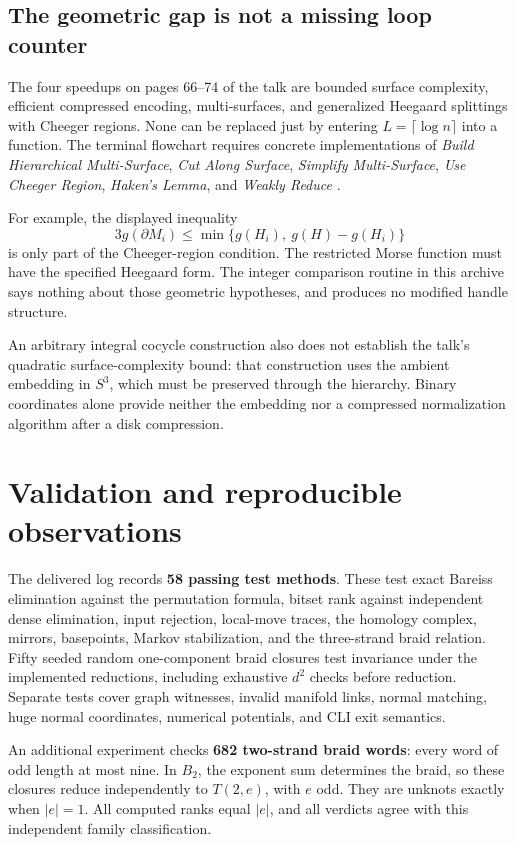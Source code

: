 \documentclass[11pt]{article}
\theoremstyle{definition}
\begin{document}
\subsection{The geometric gap is not a missing loop counter}

The four speedups on pages 66--74 of the talk are bounded surface complexity,
efficient compressed encoding, multi-surfaces, and generalized Heegaard
splittings with Cheeger regions. None can be replaced just by entering
$L=\lceil\log n\rceil$ into a function. The terminal flowchart requires concrete
implementations of \emph{Build Hierarchical Multi-Surface}, \emph{Cut Along
Surface}, \emph{Simplify Multi-Surface}, \emph{Use Cheeger Region},
\emph{Haken's Lemma}, and \emph{Weakly Reduce} \cite[p.~109]{slides}.

For example, the displayed inequality
\[
 3g(\partial M_i)\le
 \min\{g(H_i),\ g(H)-g(H_i)\}
\]
is only part of the Cheeger-region condition. The restricted Morse function
must have the specified Heegaard form. The integer comparison routine in this
archive says nothing about those geometric hypotheses, and produces no
modified handle structure.

An arbitrary integral cocycle construction also does not establish the talk's
quadratic surface-complexity bound: that construction uses the ambient
embedding in $S^3$, which must be preserved through the hierarchy. Binary
coordinates alone provide neither the embedding nor a compressed normalization
algorithm after a disk compression.

\section{Validation and reproducible observations}

The delivered log records \textbf{58 passing test methods}. These test exact
Bareiss elimination against the permutation formula, bitset rank against
independent dense elimination, input rejection, local-move traces, the homology
complex, mirrors, basepoints, Markov stabilization, and the three-strand braid
relation. Fifty seeded random one-component braid closures test invariance
under the implemented reductions, including exhaustive $d^2$ checks before
reduction. Separate tests cover graph witnesses, invalid manifold links,
normal matching, huge normal coordinates, numerical potentials, and CLI exit
semantics.

An additional experiment checks \textbf{682 two-strand braid words}: every word
of odd length at most nine. In $B_2$, the exponent sum determines the braid, so
these closures reduce independently to $T(2,e)$, with $e$ odd. They are unknots
exactly when $|e|=1$. All computed ranks equal $|e|$, and all verdicts agree
with this independent family classification.
\end{document}
